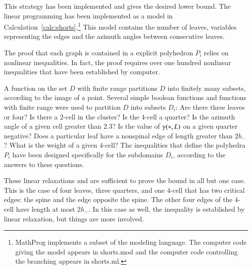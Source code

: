 This strategy has been implemented and gives the desired lower bound.
The linear programming has been implemented as a  model
in Calculation~\ref{calc:shorts}.\footnote{MathProg implements a
subset of the  modeling language.  The computer code
giving the model appears in shorts.mod and the computer code
controlling the branching appears in shorts.ml.}  This model
contains the number of leaves, variables representing the edges and
the azimuth angles between consecutive leaves.

The proof that each graph is contained in a explicit polyhedron $P_i$
relies on nonlinear inequalities.  In fact, the proof requires over
one hundred nonlinear inequalities that have been established by
computer.

A function on the set $D$ with finite range partitions $D$ into
finitely many subsets, according to the image of a point.  Several
simple boolean functions and functions with finite range were used to
partition $D$ into subsets $D_i$: Are there three leaves or four?  Is
there a $2$-cell in the cluster?  Is the $4$-cell a quarter?  Is the
azimuth angle of a given cell greater than $2.3$?  Is the value of
$\gamma({*},L)$ on a given quarter negative? Does a particular leaf have a
nonspinal edge of length greater than $2h_-$?  What is the weight of a
given $4$-cell?  The inequalities that define the polyhedra $P_i$ have
been designed specifically for the subdomains $D_i$, according to the
answers to these questions.

These linear relaxations and are sufficient to prove the bound in all
but one case.  This is the case of four leaves, three quarters, and
one $4$-cell that has two critical edges: the spine and the edge
opposite the spine.  The other four edges of the $4$-cell have length
at most $2h_-$.  In this case as well, the inequality is established
by linear relaxation, but things are more involved.


